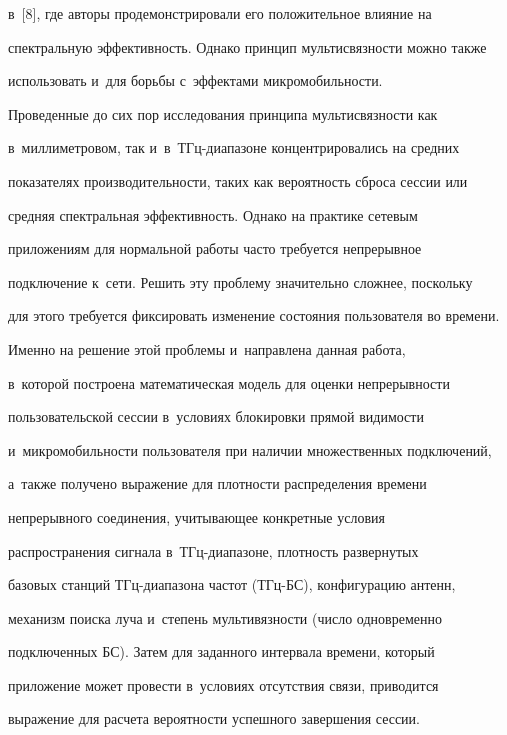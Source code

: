 в~[8], где авторы продемонстрировали его положительное вли\-яние на 


спектральную эф\-фек\-тив\-ность. Однако принцип муль\-ти\-связ\-ности мож\-но так\-же 


использовать и~для борь\-бы с~эффектами мик\-ро\-мо\-биль\-ности.


  


  Проведенные до сих пор исследования принципа муль\-ти\-связ\-ности как 


в~мил\-ли\-мет\-ро\-вом, так и~в~ТГц-диа\-па\-зо\-не концентрировались на сред\-них 


показателях про\-из\-во\-ди\-тель\-ности, таких как вероятность сброса сессии или 


средняя спектральная эф\-фек\-тив\-ность. Однако на практике сетевым 


приложениям для нормальной работы час\-то требуется непрерывное 


подключение к~сети. Решить эту проб\-ле\-му значительно сложнее, поскольку 


для этого требуется фиксировать изменение состояния пользователя во времени. 


Именно на решение этой проб\-ле\-мы и~на\-прав\-ле\-на данная работа, 


в~которой построена математическая модель для оценки не\-пре\-рыв\-ности 


пользовательской сес\-сии в~условиях блокировки прямой ви\-ди\-мости 


и~микромобильности пользователя при наличии множественных подключений, 


а~так\-же получено выражение для плот\-ности распределения времени 


непрерывного со\-еди\-не\-ния, учи\-ты\-ва\-ющее конкретные условия 


распространения сигнала в~ТГц-диа\-па\-зо\-не, плот\-ность развернутых 


базовых станций ТГц-диа\-па\-зо\-на час\-тот (ТГц-БС), конфигурацию антенн, 


механизм поиска луча и~степень мультивязности (чис\-ло одновременно 


подключенных БС). Затем для заданного интервала времени, который 


приложение может провести в~условиях отсутствия связи, приводится 


выражение для расчета вероятности успеш\-но\-го завершения сессии.





